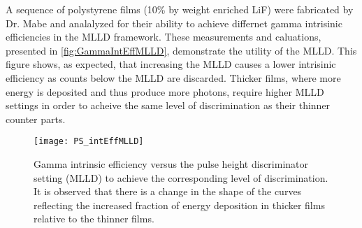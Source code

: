 A sequence of polystyrene films (10\% by weight enriched LiF) were fabricated by Dr. Mabe and analalyzed for their ability to achieve differnet gamma intrisinic efficiencies in the MLLD framework.
These measurements and caluations, presented in \autoref{fig:GammaIntEffMLLD}, demonstrate the utility of the MLLD.
This figure shows, as expected, that increasing the MLLD causes a lower intrisinic efficiency as counts below the MLLD are discarded.
Thicker films, where more energy is deposited and thus produce more photons, require higher MLLD settings in order to acheive the same level of discrimination as their thinner counter parts.
\begin{figure}
  \centering
    \texttt{[image: PS\_intEffMLLD]}
  \caption[Intrisinic efficiency achieved at various discriminator settings]{Gamma intrinsic efficiency versus the pulse height discriminator setting (MLLD) to achieve the corresponding level of discrimination. It is observed that there is a change in the shape of the curves reflecting the increased fraction of energy deposition in thicker films relative to the thinner films.}
  \label{fig:GammaIntEffMLLD}
\end{figure}

